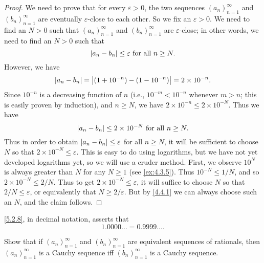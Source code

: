 \begin{proof}
  We need to prove that for every \(\varepsilon > 0\), the two sequences \((a_n)_{n = 1}^{\infty}\) and \((b_n)_{n = 1}^{\infty}\) are eventually \(\varepsilon\)-close to each other.
  So we fix an \(\varepsilon > 0\).
  We need to find an \(N > 0\) such that \((a_n)_{n = 1}^{\infty}\) and \((b_n)_{n = 1}^{\infty}\) are \(\varepsilon\)-close;
  in other words, we need to find an \(N > 0\) such that
  \[
    \left\lvert a_n - b_n\right\rvert \leq \varepsilon \text{ for all } n \geq N.
  \]
  However, we have
  \[
    \left\lvert a_n - b_n\right\rvert = \left\lvert(1 + 10^{-n}) - (1 - 10^{-n})\right\rvert = 2 \times 10^{-n}.
  \]
  Since \(10^{-n}\) is a decreasing function of \(n\) (i.e., \(10^{-m} < 10^{-n}\) whenever \(m > n\);
  this is easily proven by induction), and \(n \geq N\), we have \(2 \times 10^{-n} \leq 2 \times 10^{-N}\).
  Thus we have
  \[
    \left\lvert a_n - b_n\right\rvert \leq 2 \times 10^{-N} \text{ for all } n \geq N.
  \]
  Thus in order to obtain \(\left\lvert a_n - b_n\right\rvert \leq \varepsilon\) for all \(n \geq N\), it will be sufficient to choose \(N\) so that \(2 \times 10^{-N} \leq \varepsilon\).
  This is easy to do using logarithms, but we have not yet developed logarithms yet, so we will use a cruder method.
  First, we observe \(10^N\) is always greater than \(N\) for any \(N \geq 1\) (see \cref{ex:4.3.5}).
  Thus \(10^{-N} \leq 1 / N\), and so \(2 \times 10^{-N} \leq 2 / N\).
  Thus to get \(2 \times 10^{-N} \leq \varepsilon\), it will suffice to choose \(N\) so that \(2 / N \leq \varepsilon\), or equivalently that \(N \geq 2 / \varepsilon\).
  But by \cref{4.4.1} we can always choose such an \(N\), and the claim follows.
\end{proof}

\begin{rmk}\label{5.2.9}
  \cref{5.2.8}, in decimal notation, asserts that
  \[
    1.0000 \dots = 0.9999 \dots.
  \]
\end{rmk}

\exercisesection

\begin{ex}\label{ex:5.2.1}
  Show that if \((a_n)_{n = 1}^{\infty}\) and \((b_n)_{n = 1}^{\infty}\) are equivalent sequences of rationals, then \((a_n)_{n = 1}^{\infty}\) is a Cauchy sequence iff \((b_n)_{n = 1}^{\infty}\) is a Cauchy sequence.
\end{ex}

